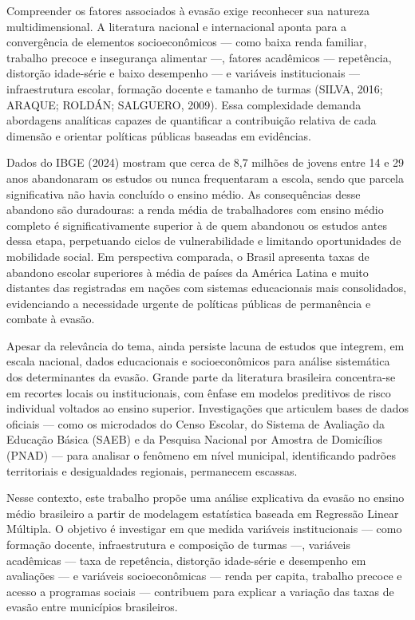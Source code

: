 \documentclass[english, spanish, brazilian]{RBIEarticle} %
\begin{document}
Compreender os fatores associados à evasão exige reconhecer sua natureza multidimensional. A literatura nacional e internacional aponta para a convergência de elementos socioeconômicos — como baixa renda familiar, trabalho precoce e insegurança alimentar —, fatores acadêmicos — repetência, distorção idade-série e baixo desempenho — e variáveis institucionais — infraestrutura escolar, formação docente e tamanho de turmas (SILVA, 2016; ARAQUE; ROLDÁN; SALGUERO, 2009). Essa complexidade demanda abordagens analíticas capazes de quantificar a contribuição relativa de cada dimensão e orientar políticas públicas baseadas em evidências.

Dados do IBGE (2024) mostram que cerca de 8,7 milhões de jovens entre 14 e 29 anos abandonaram os estudos ou nunca frequentaram a escola, sendo que parcela significativa não havia concluído o ensino médio. As consequências desse abandono são duradouras: a renda média de trabalhadores com ensino médio completo é significativamente superior à de quem abandonou os estudos antes dessa etapa, perpetuando ciclos de vulnerabilidade e limitando oportunidades de mobilidade social. Em perspectiva comparada, o Brasil apresenta taxas de abandono escolar superiores à média de países da América Latina e muito distantes das registradas em nações com sistemas educacionais mais consolidados, evidenciando a necessidade urgente de políticas públicas de permanência e combate à evasão.

Apesar da relevância do tema, ainda persiste lacuna de estudos que integrem, em escala nacional, dados educacionais e socioeconômicos para análise sistemática dos determinantes da evasão. Grande parte da literatura brasileira concentra-se em recortes locais ou institucionais, com ênfase em modelos preditivos de risco individual voltados ao ensino superior. Investigações que articulem bases de dados oficiais — como os microdados do Censo Escolar, do Sistema de Avaliação da Educação Básica (SAEB) e da Pesquisa Nacional por Amostra de Domicílios (PNAD) — para analisar o fenômeno em nível municipal, identificando padrões territoriais e desigualdades regionais, permanecem escassas.

Nesse contexto, este trabalho propõe uma análise explicativa da evasão no ensino médio brasileiro a partir de modelagem estatística baseada em Regressão Linear Múltipla. O objetivo é investigar em que medida variáveis institucionais — como formação docente, infraestrutura e composição de turmas —, variáveis acadêmicas — taxa de repetência, distorção idade-série e desempenho em avaliações — e variáveis socioeconômicas — renda per capita, trabalho precoce e acesso a programas sociais — contribuem para explicar a variação das taxas de evasão entre municípios brasileiros.
\end{document}
